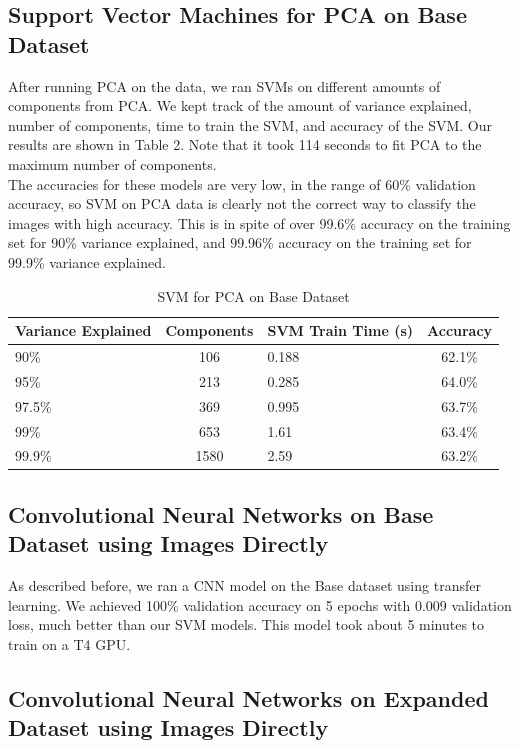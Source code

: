 \documentclass{article}
\begin{document}
\subsection{Support Vector Machines for PCA on Base Dataset}

After running PCA on the data, we ran SVMs on different amounts of components from PCA. We kept track of the amount of variance explained, number of components, time to train the SVM, and accuracy of the SVM. Our results are shown in Table 2. Note that it took 114 seconds to fit PCA to the maximum number of components. \\
The accuracies for these models are very low, in the range of 60\% validation accuracy, so SVM on PCA data is clearly not the correct way to classify the images with high accuracy. This is in spite of over 99.6\% accuracy on the training set for 90\% variance explained, and 99.96\% accuracy on the training set for 99.9\% variance explained.

\begin{table}[h]
\vskip -0.15in
\caption{SVM for PCA on Base Dataset}
\label{tab:pca_base}
\centering
\small
\begin{tabular}{p{1.5cm} | c | p{1.5cm} | c}
\toprule
Variance Explained & Components & SVM Train Time (s) & Accuracy \\
\midrule
90\% & 106 & 0.188 & 62.1\% \\
\midrule
95\% & 213 & 0.285 & 64.0\% \\
\midrule
97.5\% & 369 & 0.995 & 63.7\% \\
\midrule
99\% & 653 & 1.61 & 63.4\% \\
\midrule
99.9\% & 1580 & 2.59 & 63.2\%\\
\bottomrule
\end{tabular}
\vskip -0.1in
\end{table}

\subsection{Convolutional Neural Networks on Base Dataset using Images Directly}

As described before, we ran a CNN model on the Base dataset using transfer learning. We achieved 100\% validation accuracy on 5 epochs with 0.009 validation loss, much better than our SVM models. This model took about 5 minutes to train on a T4 GPU.

\subsection{Convolutional Neural Networks on Expanded Dataset using Images Directly}
\end{document}
